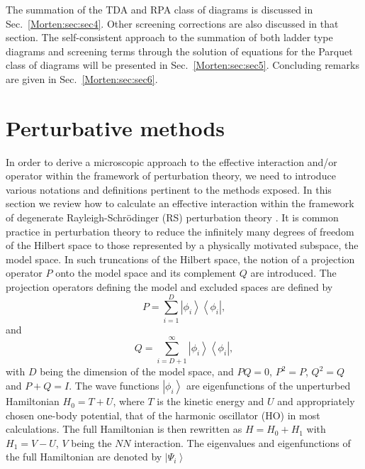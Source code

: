 The summation of the TDA and RPA class of diagrams is discussed in
Sec.~\ref{Morten:sec:sec4}. Other screening corrections are also
discussed in that section. The self-consistent approach to the 
summation of both ladder type diagrams and screening terms 
through the solution    
of equations for the Parquet class of diagrams will be presented
in Sec.~\ref{Morten:sec:sec5}. 
Concluding remarks are given in Sec.~\ref{Morten:sec:sec6}.



\section{Perturbative methods}
\label{Morten:sec:sec2}


In order to derive a microscopic approach to the effective interaction and/or operator 
within the framework of perturbation theory, we need to introduce various
notations and definitions pertinent to the methods exposed.
In this section we review how to calculate an effective 
interaction within the framework of 
degenerate Rayleigh-Schr\"{o}dinger
(RS) perturbation theory \cite{Morten:ko90,Morten:lm85}. 
It is common practice in perturbation theory to reduce the infinitely
many degrees of freedom of the Hilbert space to those represented
by a physically motivated subspace, the model space.
In such truncations of the Hilbert space, the notion of a projection
operator $P$ onto the model space and its complement $Q$ are
introduced. The projection operators defining the model and excluded
spaces are defined by
\begin{equation}
        P=\sum_{i=1}^{D} \left|\phi_i\right\rangle
        \left\langle\phi_i\right |,
\end{equation}
and
\begin{equation}
        Q=\sum_{i=D+1}^{\infty} \left|\phi_i\right\rangle
        \left\langle\phi_i\right |,
\end{equation}
with $D$ being the dimension of the model space, and $PQ=0$, $P^2 =P$,
$Q^2 =Q$ and $P+Q=I$. The wave functions $\left|\phi_i\right\rangle$ 
are eigenfunctions
of the unperturbed Hamiltonian $H_0 = T+U$, where $T$ is the kinetic
energy and $U$ and appropriately chosen one-body potential, that of the
harmonic oscillator (HO) in most calculations. The full Hamiltonian
is then rewritten as $H=H_0 +H_1$ with $H_1=V-U$, $V$ being the
$NN$    interaction. The eigenvalues
and eigenfunctions of the full Hamiltonian are denoted by
$\left|\Psi_{i}\right\rangle$
